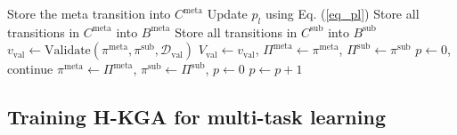 \documentclass[11pt]{article}
\begin{document}
\begin{algorithm}[t!]
\begin{algorithmic}[1]
            \EndIf
        \EndWhile
        \State Store the meta transition into $C^{\text{meta}}$
    \EndFor
    \State Update $p_l$ using Eq. (\ref{eq_pl})
        \State Store all transitions in $C^{\text{meta}}$ into $B^{\text{meta}}$
    \EndIf
        \State Store all transitions in $C^{\text{sub}}$ into $B^{\text{sub}}$
    \EndIf
        \State $v_{\text{val}} \leftarrow \text{Validate}(\pi^{\text{meta}},\pi^{\text{sub}}, \mathcal{D}_{\text{val}})$
            \State $V_{\text{val}} \leftarrow v_{\text{val}}$, $\Pi^{\text{meta}} \leftarrow \pi^{\text{meta}}$, $\Pi^{\text{sub}} \leftarrow \pi^{\text{sub}}$
            \State $p \leftarrow 0$, continue
        \EndIf
            \State $\pi^{\text{meta}} \leftarrow \Pi^{\text{meta}}$, $\pi^{\text{sub}} \leftarrow \Pi^{\text{sub}}$, $p \leftarrow 0$
        \Else 
            \State $p \leftarrow p+1$
        \EndIf
    \EndIf
\EndFor
\end{algorithmic}
\end{algorithm}

\subsection{Training H-KGA for multi-task learning \label{section_method_part3}}
\end{document}
